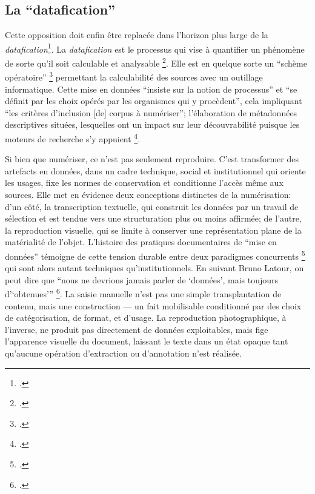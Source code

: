 \subsection{La \enquote{datafication}}

Cette opposition doit enfin être replacée dans l’horizon plus large de la \emph{datafication}\footcite[][]{clavert}. La \emph{datafication} est le processus qui vise à quantifier un phénomène de sorte qu'il soit calculable et analysable \footcite[][]{clavert}. Elle est en quelque sorte un \enquote{schème opératoire} \footcite[][p. 236]{meot} permettant la calculabilité des sources avec un outillage informatique. Cette mise en données \enquote{insiste sur la notion de processus} et \enquote{se définit par les choix opérés par les organismes qui y procèdent}, cela impliquant \enquote{les critères d'inclusion [de] corpus à numériser}; l'élaboration de métadonnées descriptives situées, lesquelles ont un impact sur leur découvrabilité puisque les moteurs de recherche s'y appuient \footcite[][p. 123]{clavert}.

Si bien que numériser, ce n’est pas seulement reproduire. C’est transformer des artefacts en données, dans un cadre technique, social et institutionnel qui oriente les usages, fixe les normes de conservation et conditionne l’accès même aux sources. Elle met en évidence deux conceptions distinctes de la numérisation: d’un côté, la transcription textuelle, qui construit les données par un travail de sélection et est tendue vers une structuration plus ou moins affirmée; de l’autre, la reproduction visuelle, qui se limite à conserver une représentation plane de la matérialité de l’objet. L’histoire des pratiques documentaires de \enquote{mise en données} témoigne de cette tension durable entre deux paradigmes concurrents \footcite[][p. 29]{bermesbook} qui sont alors autant techniques qu'institutionnels. En suivant Bruno Latour, on peut dire que \enquote{nous ne devrions jamais parler de ‘données’, mais toujours d'‘obtenues’} \footcite[][]{goeta}. La saisie manuelle n'est pas une simple transplantation de contenu, mais une construction — un fait mobilisable conditionné par des choix de catégorisation, de format, et d’usage. La reproduction photographique, à l’inverse, ne produit pas directement de données exploitables, mais fige l’apparence visuelle du document, laissant le texte dans un état opaque tant qu’aucune opération d’extraction ou d’annotation n’est réalisée.

